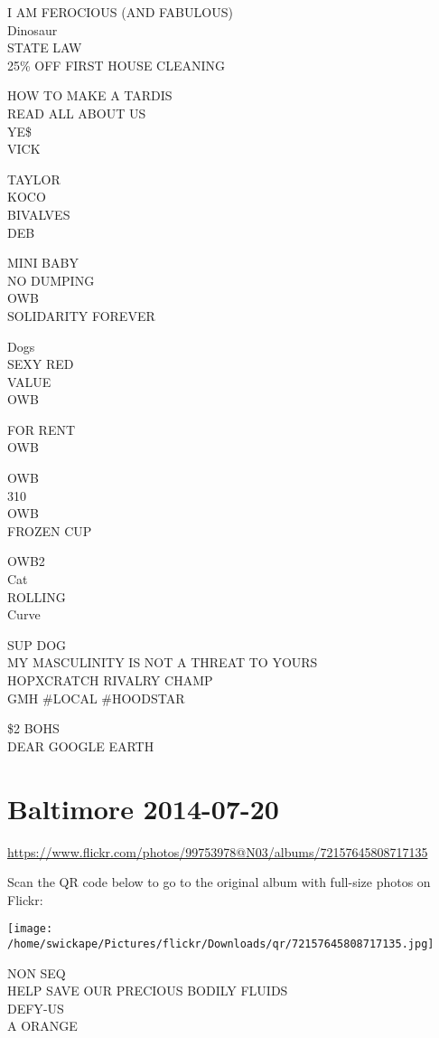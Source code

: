 \documentclass[10pt,letterpaper]{article}
\begin{document}
I AM FEROCIOUS (AND FABULOUS)\\
Dinosaur\\
STATE LAW\\
25\% OFF FIRST HOUSE CLEANING

HOW TO MAKE A TARDIS\\
READ ALL ABOUT US\\
YE\$\\
VICK

TAYLOR\\
KOCO\\
BIVALVES\\
DEB

MINI BABY\\
NO DUMPING\\
OWB\\
SOLIDARITY FOREVER

Dogs\\
SEXY RED\\
VALUE\\
OWB

FOR RENT\\
OWB

OWB\\
310\\
OWB\\
FROZEN CUP

OWB2\\
Cat\\
ROLLING\\
Curve

SUP DOG\\
MY MASCULINITY IS NOT A THREAT TO YOURS\\
HOPXCRATCH RIVALRY CHAMP\\
GMH \#LOCAL \#HOODSTAR

\$2 BOHS\\
DEAR GOOGLE EARTH


\section*{Baltimore 2014-07-20}

\url{https://www.flickr.com/photos/99753978@N03/albums/72157645808717135}

Scan the QR code below to go to the original album with full-size photos on Flickr:

\texttt{[image: /home/swickape/Pictures/flickr/Downloads/qr/72157645808717135.jpg]}


NON SEQ\\
HELP SAVE OUR PRECIOUS BODILY FLUIDS\\
DEFY{-}US\\
A ORANGE
\end{document}
